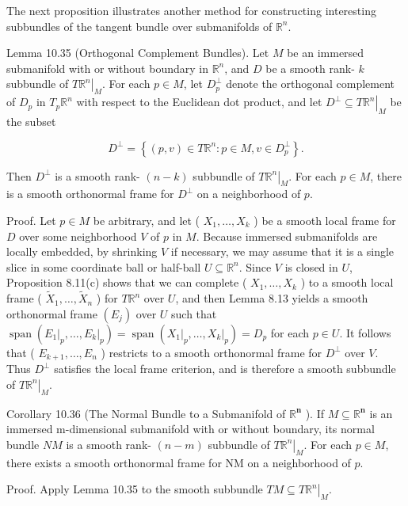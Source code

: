 \documentclass[10pt]{article}
\begin{document}
The next proposition illustrates another method for constructing interesting subbundles of the tangent bundle over submanifolds of $\mathbb{R}^{n}$.

Lemma 10.35 (Orthogonal Complement Bundles). Let $M$ be an immersed submanifold with or without boundary in $\mathbb{R}^{n}$, and $D$ be a smooth rank- $k$ subbundle of $\left.T \mathbb{R}^{n}\right|_{M}$. For each $p \in M$, let $D_{p}^{\perp}$ denote the orthogonal complement of $D_{p}$ in $T_{p} \mathbb{R}^{n}$ with respect to the Euclidean dot product, and let $\left.D^{\perp} \subseteq T \mathbb{R}^{n}\right|_{M}$ be the subset

$$
D^{\perp}=\left\{(p, v) \in T \mathbb{R}^{n}: p \in M, v \in D_{p}^{\perp}\right\} .
$$

Then $D^{\perp}$ is a smooth rank- $(n-k)$ subbundle of $\left.T \mathbb{R}^{n}\right|_{M}$. For each $p \in M$, there is a smooth orthonormal frame for $D^{\perp}$ on a neighborhood of $p$.

Proof. Let $p \in M$ be arbitrary, and let ( $X_{1}, \ldots, X_{k}$ ) be a smooth local frame for $D$ over some neighborhood $V$ of $p$ in $M$. Because immersed submanifolds are locally embedded, by shrinking $V$ if necessary, we may assume that it is a single slice in some coordinate ball or half-ball $U \subseteq \mathbb{R}^{n}$. Since $V$ is closed in $U$, Proposition 8.11(c) shows that we can complete ( $X_{1}, \ldots, X_{k}$ ) to a smooth local frame ( $\widetilde{X}_{1}, \ldots, \widetilde{X}_{n}$ ) for $T \mathbb{R}^{n}$ over $U$, and then Lemma 8.13 yields a smooth orthonormal frame $\left(E_{j}\right)$ over $U$ such that $\operatorname{span}\left(\left.E_{1}\right|_{p}, \ldots,\left.E_{k}\right|_{p}\right)=\operatorname{span}\left(\left.X_{1}\right|_{p}, \ldots,\left.X_{k}\right|_{p}\right)=D_{p}$ for each $p \in U$. It follows that ( $E_{k+1}, \ldots, E_{n}$ ) restricts to a smooth orthonormal frame for $D^{\perp}$ over $V$. Thus $D^{\perp}$ satisfies the local frame criterion, and is therefore a smooth subbundle of $\left.T \mathbb{R}^{n}\right|_{M}$.

Corollary 10.36 (The Normal Bundle to a Submanifold of $\mathbb{R}^{\boldsymbol{n}}$ ). If $M \subseteq \mathbb{R}^{\boldsymbol{n}}$ is an immersed m-dimensional submanifold with or without boundary, its normal bundle $N M$ is a smooth rank- $(n-m)$ subbundle of $\left.T \mathbb{R}^{n}\right|_{M}$. For each $p \in M$, there exists a smooth orthonormal frame for NM on a neighborhood of $p$.

Proof. Apply Lemma 10.35 to the smooth subbundle $\left.T M \subseteq T \mathbb{R}^{n}\right|_{M}$.
\end{document}
